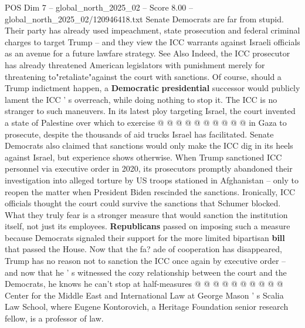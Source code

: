 \begin{textsample}{POS Dim 7 – global\_north\_2025\_02 – Score 8.00 – global\_north\_2025\_02/120946418.txt}
Senate Democrats are far from stupid.
Their party has already used impeachment, state prosecution and federal criminal charges to target Trump -- and they view the ICC warrants against Israeli officials as an avenue for a future lawfare strategy.
See Also Indeed, the ICC prosecutor has already threatened American legislators with punishment merely for threatening to"retaliate"against the court with sanctions.
Of course, should a Trump indictment happen, a \textbf{Democratic} \textbf{presidential} successor would publicly lament the ICC ' s overreach, while doing nothing to stop it.
The ICC is no stranger to such maneuvers.
In its latest ploy targeting Israel, the court invented a state of Palestine over which to exercise @ @ @ @ @ @ @ @ @ @ in Gaza to prosecute, despite the thousands of aid trucks Israel has facilitated.
Senate Democrats also claimed that sanctions would only make the ICC dig in its heels against Israel, but experience shows otherwise.
When Trump sanctioned ICC personnel via executive order in 2020, its prosecutors promptly abandoned their investigation into alleged torture by US troops stationed in Afghanistan -- only to reopen the matter when President Biden rescinded the sanctions.
Ironically, ICC officials thought the court could survive the sanctions that Schumer blocked.
What they truly fear is a stronger measure that would sanction the institution itself, not just its employees. \textbf{Republicans} passed on imposing such a measure because Democrats signaled their support for the more limited bipartisan \textbf{bill} that passed the House.
Now that the fa? ade of cooperation has disappeared, Trump has no reason not to sanction the ICC once again by executive order -- and now that he ' s witnessed the cozy relationship between the court and the Democrats, he knows he can't stop at half-measures @ @ @ @ @ @ @ @ @ @ Center for the Middle East and International Law at George Mason ' s Scalia Law School, where Eugene Kontorovich, a Heritage Foundation senior research fellow, is a professor of law.

\end{textsample}
